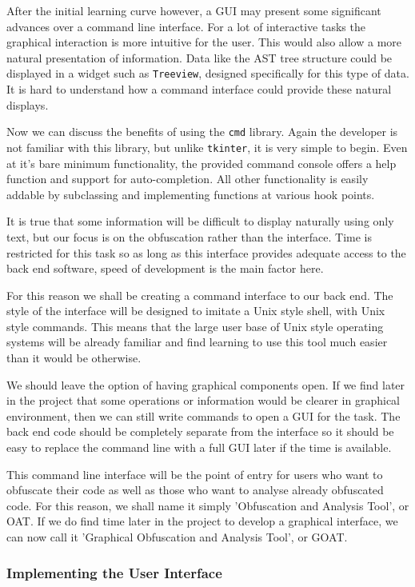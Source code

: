 \documentclass[twoside,a4paper]{report}
\begin{document}
After the initial learning curve however, a GUI may present some significant advances over a command line interface. For a lot of interactive
tasks the graphical interaction is more intuitive for the user. This would also allow a more natural presentation of information. Data like
the AST tree structure could be displayed in a widget such as \texttt{Treeview}, designed specifically for this type of data. It is hard to
understand how a command interface could provide these natural displays.

Now we can discuss the benefits of using the \texttt{cmd} library. Again the developer is not familiar with this library, but unlike
\texttt{tkinter}, it is very simple to begin. Even at it's bare minimum functionality, the provided command console offers a help
function and support for auto-completion. All other functionality is easily addable by subclassing and implementing functions at various
hook points.

It is true that some information will be difficult to display naturally using only text, but our focus is on the obfuscation rather than
the interface. Time is restricted for this task so as long as this interface provides adequate access to the back end software, speed
of development is the main factor here.

For this reason we shall be creating a command interface to our back end. The style of the interface will be designed to imitate a
Unix style shell, with Unix style commands. This means that the large user base of Unix style operating systems will be already familiar
and find learning to use this tool much easier than it would be otherwise.

We should leave the option of having graphical components open. If we find later in the project that some operations or information would
be clearer in graphical environment, then we can still write commands to open a GUI for the task. The back end code should be completely
separate from the interface so it should be easy to replace the command line with a full GUI later if the time is available.

This command line interface will be the point of entry for users who want to obfuscate their code as well as those who want to analyse
already obfuscated code. For this reason, we shall name it simply 'Obfuscation and Analysis Tool', or OAT. If we do find time later in
the project to develop a graphical interface, we can now call it 'Graphical Obfuscation and Analysis Tool', or GOAT.

\subsubsection{Implementing the User Interface}
\end{document}
